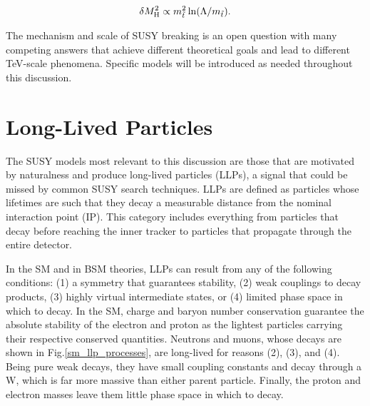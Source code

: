 \documentclass[12pt]{article}
\begin{document}
    \noindent \begin{equation}
        \delta M_{\mathrm{H}}^2 \propto m_{\tilde{t}}^2 \ln(\Lambda/m_{\tilde{t}}).
    \label{higgs_susy_correction}
    \end{equation}
    
    \noindent The mechanism and scale of SUSY breaking is an open question with many competing answers that achieve different theoretical goals and lead to different TeV-scale phenomena. Specific models will be introduced as needed throughout this discussion.

\section{Long-Lived Particles}
    The SUSY models most relevant to this discussion are those that are motivated by naturalness and produce long-lived particles (LLPs), a signal that could be missed by common SUSY search techniques. LLPs are defined as particles whose lifetimes are such that they decay a measurable distance from the nominal interaction point (IP). This category includes everything from particles that decay before reaching the inner tracker to particles that propagate through the entire detector. 

    In the SM and in BSM theories, LLPs can result from any of the following conditions: (1) a symmetry that guarantees stability, (2) weak couplings to decay products, (3) highly virtual intermediate states, or (4) limited phase space in which to decay. In the SM, charge and baryon number conservation guarantee the absolute stability of the electron and proton as the lightest particles carrying their respective conserved quantities. Neutrons and muons, whose decays are shown in Fig.\ref{sm_llp_processes}, are long-lived for reasons (2), (3), and (4). Being pure weak decays, they have small coupling constants and decay through a W, which is far more massive than either parent particle. Finally, the proton and electron masses leave them little phase space in which to decay.
\end{document}
